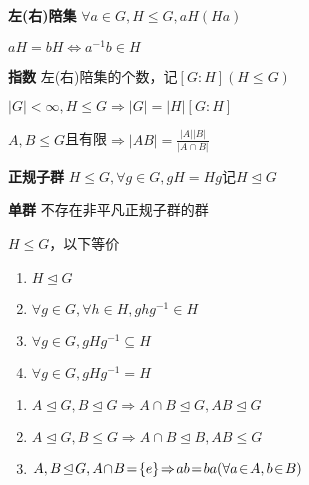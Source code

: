 \documentclass[a4paper,10pt]{ctexart}
\newcommand*{\impl}{\Rightarrow}
\renewcommand*{\iff}{\Leftrightarrow}
\renewcommand*{\leq}{\leqslant}
\newcommand*{\nmsubgroupeq}{\trianglelefteq}
\begin{document}
\begin{multicols}{3}
    \textbf{左(右)陪集} $\forall a \!\in\! G, H \!\leq\! G, aH(Ha)$

    \begin{theorem}[陪集相等判则]
        $aH = bH \iff a^{-1}b \in H$
    \end{theorem}

    \textbf{指数} 左(右)陪集的个数，记$[G\!:\!H](H \!\leq\! G)$

    \begin{theorem}[Lagrange定理]
        $|G| \! < \! \infty, H \!\leq\! G \!\impl\! |G| \! =\! |H|[G:H]$
    \end{theorem}

    \begin{theorem}[子群阶]
        $A, B \!\leq\! G$且有限$\impl |AB| = \frac{ |A| |B| }{ |A \cap B| }$
    \end{theorem}

    \textbf{正规子群} $H \!\!\leq\!\! G, \forall g \!\in\! G, gH \! = \! Hg$记$H \!\nmsubgroupeq\! G$

    \textbf{单群} 不存在非平凡正规子群的群

    \begin{theorem}[正规子群判则]
        $H \leq G$，以下等价
        \begin{enumerate}
            \item $H \nmsubgroupeq G$
            \item $\forall g \in G,\forall h \in H, ghg^{-1} \in H$
            \item $\forall g \in G, gHg^{-1} \subseteq H$
            \item $\forall g \in G, gHg^{-1} = H$
        \end{enumerate}
    \end{theorem}

    \begin{theorem}[正规子群运算律]
        \hfil

        \begin{enumerate}
            \item $A \!\nmsubgroupeq\! G, B \!\nmsubgroupeq\! G \!\impl\! A \!\cap\! B \!\nmsubgroupeq\! G, AB \!\nmsubgroupeq\! G$
            \item $A \!\nmsubgroupeq\! G, B \!\leq\! G \!\impl\! A \!\cap\! B \!\nmsubgroupeq\! B, AB \!\leq\! G$
            \item $A, B \!\nmsubgroupeq\! G, A \!\cap\! B \! = \! \{e\} \!\impl\! ab \! = \! ba \\ (\forall a \!\in\! A, b \!\in\! B)$
        \end{enumerate}
    \end{theorem}


\end{multicols}
\end{document}
